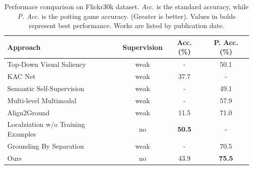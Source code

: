 \documentclass{article}
\begin{document}
\begin{table}
  \centering
  \bgroup
  \resizebox{\textwidth}{!} {%
  \begin{tabular}{lccc}
    \toprule
    \textbf{Approach} & \textbf{Supervision} & \textbf{Acc. (\%)} & \textbf{P. Acc. (\%)} \\
    \midrule
    Top-Down Visual Saliency \cite{ramanishka2017top}        & weak & -    & 50.1 \\
    KAC Net \cite{chen2018knowledge}                         & weak & 37.7 & -    \\
    Semantic Self-Supervision \cite{javed2018learning}       & weak & -    & 49.1 \\
    Multi-level Multimodal \cite{akbari2019multi}            & weak & -    & 57.9 \\
    Align2Ground \cite{datta2019align2ground}                & weak & 11.5 & 71.0 \\
    Localziation w/o Training Examples \cite{wang2019phrase} & no   & \textbf{50.5} & -    \\
    Grounding By Separation \cite{arbelle2021detector}       & weak & -    & 70.5 \\
    \midrule
    Ours                                                     & no   & 43.9 & \textbf{75.5} \\
    \bottomrule
  \end{tabular}
  }
  \egroup
  \caption{Performace comparison on Flickr30k dataset. \textit{Acc.}
  is the standard accuracy, while \textit{P. Acc.} is the poiting game
  accuracy. (Greater is better). Values in bolds represent best
  performance. Works are listed by publication date.}
  \label{tab:results}
\end{table}

\pagebreak
\printbibliography
\end{document}
